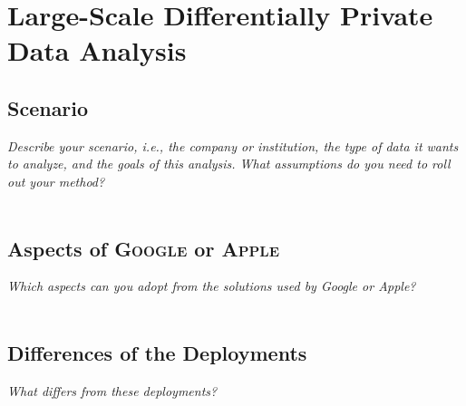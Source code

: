 \documentclass{report}
\begin{document}
	\section{Large-Scale Differentially Private Data Analysis}
	\startsection
		\renewcommand{\thesubsection}{\thesection.\alph{subsection}}
		\subsection{Scenario}
		\startsubsection
			\textit{Describe your scenario, i.e., the company or institution, the type of data it wants to analyze, and the goals of this analysis. What assumptions do you need to roll out your method?} \\ \\ 
		\closesection
		\subsection{Aspects of \textsc{Google} or \textsc{Apple}}
		\startsubsection
			\textit{Which aspects can you adopt from the solutions used by Google or Apple?} \\ \\
		\closesection
		\subsection{Differences of the Deployments}
		\startsubsection
			\textit{What differs from these deployments?} \\ \\
		\closesection
	\closesection
\end{document}
